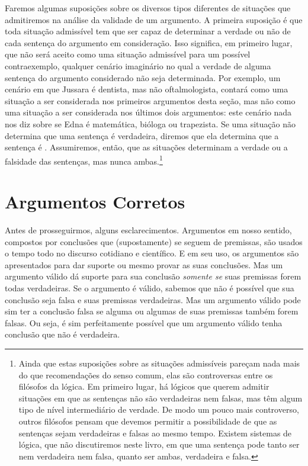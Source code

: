 Faremos algumas suposições sobre os diversos tipos diferentes de situações que admitiremos na análise da validade de um argumento.
A primeira suposição é que toda situação admissível tem que ser capaz de determinar a verdade ou não de cada sentença do argumento em consideração.
Isso significa, em primeiro lugar, que não será aceito como uma situação admissível para um possível contraexemplo, qualquer cenário imaginário no qual a verdade de alguma sentença do argumento considerado não seja determinada.
Por exemplo, um cenário em que Jussara é dentista, mas não oftalmologista, contará como uma situação a ser considerada nos primeiros argumentos desta seção, mas não como uma situação a ser considerada nos últimos dois argumentos:
este cenário nada nos diz sobre se Edna é matemática, bióloga ou trapezista.
Se uma situação não determina que uma sentença é verdadeira, diremos que ela determina que a sentença é .
Assumiremos, então, que as situações determinam a verdade ou a falsidade das sentenças, mas nunca ambas.\footnote{
	Ainda que estas suposições sobre as situações admissíveis pareçam nada mais do que recomendações do senso comum, elas são controversas entre os filósofos da lógica.
Em primeiro lugar, há lógicos que querem admitir situações em que as sentenças não são verdadeiras nem falsas, mas têm algum tipo de nível intermediário de verdade.
De modo um pouco mais controverso, outros filósofos pensam que devemos permitir a possibilidade de que as sentenças sejam verdadeiras e falsas ao mesmo tempo. Existem sistemas de lógica, que não discutiremos neste livro, em que uma sentença pode tanto ser nem verdadeira nem falsa, quanto ser ambas, verdadeira e falsa.}


\section{Argumentos Corretos}

Antes de prosseguirmos, alguns esclarecimentos.
Argumentos em nosso sentido, compostos por conclusões que (supostamente) se seguem de premissas, são usados o tempo todo no discurso cotidiano e científico.
E em seu uso, os argumentos são apresentados para dar suporte ou mesmo provar as suas conclusões.
Mas um argumento válido dá suporte para sua conclusão \emph{somente se} suas premissas forem todas verdadeiras.
Se o argumento é válido, sabemos que não é possível que sua conclusão seja falsa e suas premissas verdadeiras.
Mas um argumento válido pode sim ter a conclusão falsa se alguma ou algumas de suas premissas também forem falsas.
Ou seja, é sim perfeitamente possível que um argumento válido tenha conclusão que não é verdadeira.

